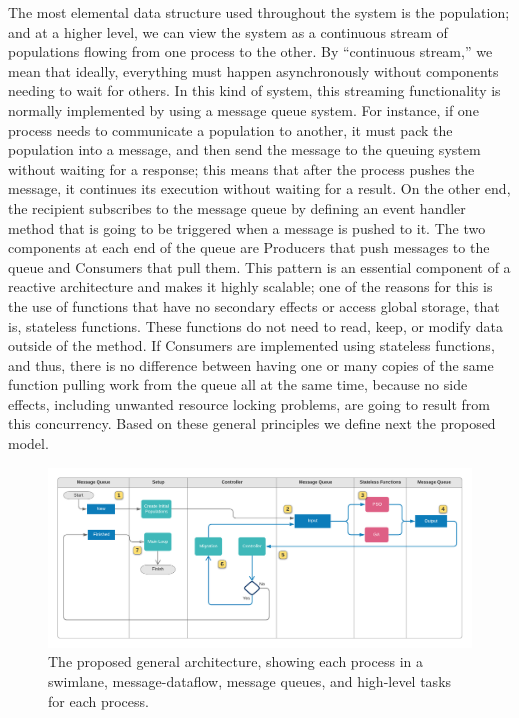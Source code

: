 \documentclass[review]{elsarticle}
\begin{document}
The most elemental data structure used throughout the system is the population; and at a higher
level, we can view the system as a continuous stream of populations
flowing from one process to the other. By ``continuous stream,'' we mean that ideally,
everything must happen asynchronously without components needing to wait for
others. In this kind of system, this streaming functionality is normally
implemented by using a message queue system. For instance, if one process needs
to communicate a population to another, it must pack the population into
a message, and then send the message 
to the queuing system without waiting for a response; this
means that after the process pushes the message, it continues its execution
without waiting for a result. On the other end, the recipient subscribes to the
message queue by defining an event handler method that is going to be triggered when a
message is pushed to it. The two components at each end of the queue are
Producers that push messages to the queue and Consumers that pull them. This
pattern is an essential component of a reactive architecture and makes
it 
highly scalable; one of the reasons for this is the use of functions
that have no secondary effects or access global storage, that is,
stateless functions. These functions do not need to read, keep, or modify data outside of the method. If
Consumers are implemented using stateless functions, and thus, there is no difference
between having one or many copies of the same function pulling work from the queue all at the
same time, because no side effects, including unwanted resource
locking problems,  are going to result from this concurrency.
Based on these general principles we define next the proposed model.


\begin{figure}
    \centering
    \includegraphics[width=\textwidth]{KafkEOsmall}
    \caption{The proposed general architecture, 
     showing each process in a swimlane, message-dataflow,
     message queues, and high-level tasks for each process.} 
    \label{fig:kafkEO}
\end{figure}
\end{document}
